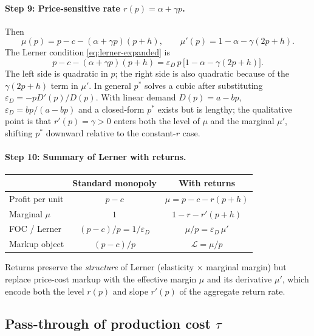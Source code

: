 \documentclass[11pt]{article}
\begin{document}
\paragraph{Step 9: Price-sensitive rate $r(p)=\alpha+\gamma p$.}
Then
\[
  \mu(p) = p - c - (\alpha+\gamma p)(p+h),
  \qquad
  \mu'(p) = 1 - \alpha - \gamma(2p+h).
\]
The Lerner condition \eqref{eq:lerner-expanded} is
\[
  p - c - (\alpha+\gamma p)(p+h)
  = \varepsilon_D\, p\,\bigl[1 - \alpha - \gamma(2p+h)\bigr].
\]
The left side is quadratic in $p$; the right side is also quadratic because
of the $\gamma(2p+h)$ term in $\mu'$.  In general $p^*$ solves a cubic after
substituting $\varepsilon_D = -p D'(p)/D(p)$.  With linear demand
$D(p)=a-bp$, $\varepsilon_D = bp/(a-bp)$ and a closed-form $p^*$ exists but
is lengthy; the qualitative point is that $r'(p)=\gamma>0$ enters both the
level of $\mu$ and the marginal $\mu'$, shifting $p^*$ downward relative to
the constant-$r$ case.

\paragraph{Step 10: Summary of Lerner with returns.}
\begin{center}
\begin{tabular}{lcc}
  \hline
  & Standard monopoly & With returns \\
  \hline
  Profit per unit & $p-c$ & $\mu = p-c-r(p+h)$ \\
  Marginal $\mu$ & $1$ & $1-r-r'(p+h)$ \\
  FOC / Lerner & $(p-c)/p = 1/\varepsilon_D$
  & $\mu/p = \varepsilon_D\,\mu'$ \\
  Markup object & $(p-c)/p$ & $\mathcal{L}=\mu/p$ \\
  \hline
\end{tabular}
\end{center}
Returns preserve the \emph{structure} of Lerner (elasticity $\times$ marginal
margin) but replace price-cost markup with the effective margin $\mu$ and its
derivative $\mu'$, which encode both the level $r(p)$ and slope $r'(p)$ of
the aggregate return rate.

\subsection{Pass-through of production cost $\tau$}
\end{document}
